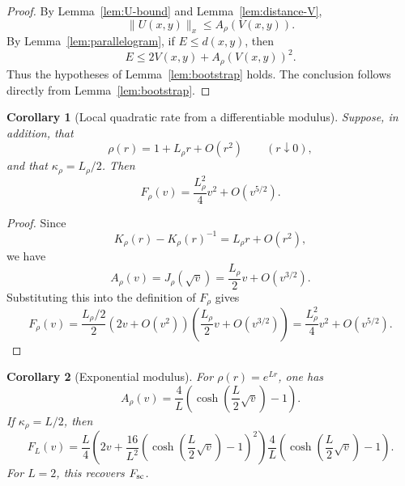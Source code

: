 \documentclass[11pt]{article}
\newtheorem{corollary}{Corollary}
\begin{document}
\begin{proof}
By Lemma~\ref{lem:U-bound} and Lemma~\ref{lem:distance-V},
\[
    \|U(x,y)\|_x\le A_\rho(V(x,y)).
\]
By Lemma~\ref{lem:parallelogram}, if \(E\le d(x,y)\), then
\[
    E\le 2V(x,y)+A_\rho(V(x,y))^2.
\]
Thus the hypotheses of Lemma~\ref{lem:bootstrap} holds. 
The conclusion follows directly from Lemma~\ref{lem:bootstrap}.
\end{proof}

\begin{corollary}[Local quadratic rate from a differentiable modulus]
Suppose, in addition, that
\[
    \rho(r)=1+L_\rho r+O(r^2)
    \qquad (r\downarrow0),
\]
and that \(\kappa_\rho=L_\rho/2\). Then
\[
    F_\rho(v)=\frac{L_\rho^2}{4}v^2+O(v^{5/2}).
\]
\end{corollary}

\begin{proof}
Since
\[
    K_\rho(r)-K_\rho(r)^{-1}=L_\rho r+O(r^2),
\]
we have
\[
    A_\rho(v)=J_\rho(\sqrt v)=\frac{L_\rho}{2}v+O(v^{3/2}).
\]
Substituting this into the definition of \(F_\rho\) gives
\[
    F_\rho(v)
    =\frac{L_\rho/2}{2}\left(2v+O(v^2)\right)
      \left(\frac{L_\rho}{2}v+O(v^{3/2})\right)
    =\frac{L_\rho^2}{4}v^2+O(v^{5/2}).
\]
\end{proof}

\begin{corollary}[Exponential modulus]
For \(\rho(r)=e^{Lr}\), one has
\[
    A_\rho(v)=\frac{4}{L}\left(\cosh\left(\frac{L}{2}\sqrt v\right)-1\right).
\]
If \(\kappa_\rho=L/2\), then
\[
    F_L(v)=
    \frac{L}{4}
    \left(2v+
    \frac{16}{L^2}\left(\cosh\left(\frac{L}{2}\sqrt v\right)-1\right)^2
    \right)
    \frac{4}{L}\left(\cosh\left(\frac{L}{2}\sqrt v\right)-1\right).
\]
For \(L=2\), this recovers \(F_{\rm sc}\).
\end{corollary}
\end{document}

